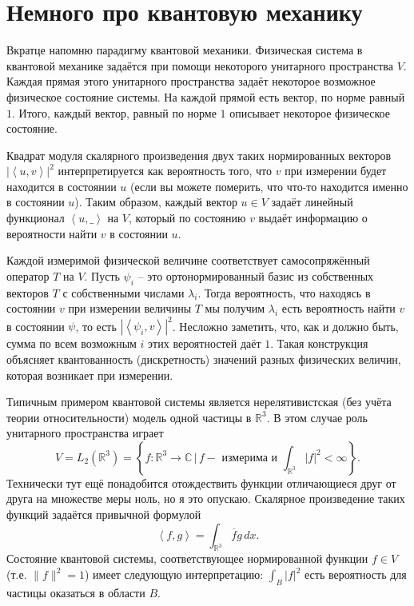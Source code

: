 \documentclass[12pt,a4paper,oneside]{book}
\theoremstyle{definition}
\newcommand{\ovl}{\overline}
\newcommand{\R}{\mathbb R}
\renewcommand{\C}{\mathbb C}
\def\lan{\left\langle }
\def\ran{\right\rangle}
\begin{document}
\section{Немного про квантовую механику}

Вкратце напомню парадигму квантовой механики. Физическая система в квантовой механике задаётся при помощи некоторого унитарного пространства $V$. Каждая прямая этого унитарного пространства задаёт некоторое возможное физическое состояние системы. На каждой прямой есть вектор, по норме равный $1$. Итого, каждый вектор, равный по норме $1$ описывает некоторое физическое состояние. 

Квадрат модуля скалярного произведения двух таких нормированных векторов  $|\lan u,v \ran|^2$ интерпретируется как вероятность того, что  $v$ при измерении будет находится в состоянии $u$ (если вы можете померить, что что-то находится именно в состоянии $u$). Таким образом, каждый вектор $u\in V$ задаёт линейный функционал $\lan u, \_ \ran $ на $V$, который по состоянию $v$ выдаёт информацию о вероятности найти $v$ в состоянии $u$.

Каждой измеримой физической величине соответствует самосопряжённый оператор $T$ на $V$. Пусть $\psi_i$ -- это ортонормированный базис из собственных векторов $T$ с собственными числами $\lambda_i$. Тогда вероятность, что находясь в состоянии $v$ при измерении величины $T$ мы получим $\lambda_i$ есть вероятность найти $v$ в состоянии $\psi$, то есть $|\lan \psi_i, v \ran|^2$. Несложно заметить, что, как и должно быть, сумма по всем возможным $i$ этих вероятностей даёт $1$. Такая конструкция объясняет квантованность (дискретность) значений разных физических величин, которая возникает при измерении.

Типичным примером квантовой системы является нерелятивистская (без учёта теории относительности) модель одной частицы в $\R^3$. В этом случае роль унитарного пространства играет 
$$V= L_2(\R^3)=\left\{  f\colon \R^3 \to \C\, \Big| \, f - \text{ измерима и } \int_{\R^3} |f|^2<\infty \right\}.$$
Технически тут ещё понадобится отождествить функции отличающиеся друг от друга на множестве меры ноль, но я это опускаю. Скалярное произведение таких функций задаётся привычной формулой 
$$\lan f,g \ran = \int_{\R^3} \ovl{f}g\, dx.$$
Состояние квантовой системы, соответствующее нормированной функции $f\in V$ (т.е. $\|f\|^2=1$)  имеет следующую интерпретацию: $\int_{B} |f|^2$ есть вероятность для частицы оказаться в области $B$. 

 
\end{document}
